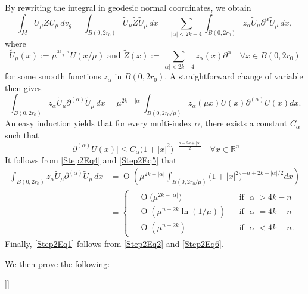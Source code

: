 \documentclass[reqno]{amsart}
\numberwithin{equation}{section}
\DeclareMathOperator{\bigO}{O}
\newcommand{\R}{\mathbb{R}}
\newcommand{\<}{\left<}
\renewcommand{\>}{\right>}
\renewcommand{\[}{\left[}
\renewcommand{\]}{\right]}
\renewcommand{\(}{\left(}
\renewcommand{\)}{\right)}
\begin{document}
\[\[\proof[Proof of Step~\ref{Step2}]
By rewriting the integral in geodesic normal coordinates, we obtain
\begin{equation}\label{Step2Eq2}
\int_MU_\mu ZU_\mu\,dv_g=\int_{B\(0,2r_0\)}\widetilde{U}_\mu\widetilde{Z}\widetilde{U}_\mu\,dx=\sum_{\left|\alpha\right|<2k-4}\int_{B\(0,2r_0\)} z_\alpha\widetilde{U}_\mu\partial^{\alpha}\widetilde{U}_\mu\,dx,
\end{equation}
where 
\begin{equation}\label{Step2Eq3}
\widetilde{U}_\mu\(x\):=\mu^{\frac{2k-n}{2}}U\(x/\mu\)\text{ and }\widetilde{Z}\(x\):=\sum_{\left|\alpha\right|<2k-4}z_\alpha\(x\)\partial^{\alpha}\quad\forall x\in B\(0,2r_0\)
\end{equation}
for some smooth functions $z_\alpha$ in $B\(0,2r_0\)$. A straightforward change of variable then gives
\begin{equation}\label{Step2Eq4}
\int_{B\(0,2r_0\)} z_\alpha\widetilde{U}_\mu\partial^{\(\alpha\)}\widetilde{U}_\mu\,dx=\mu^{2k-\left|\alpha\right|}\int_{B\(0,2r_0/\mu\)} z_\alpha\(\mu x\)U\(x\)\partial^{\(\alpha\)}U\(x\)dx.
\end{equation}
An easy induction yields that for every multi-index $\alpha$, there exists a constant $C_\alpha$ such that 
\begin{equation}\label{Step2Eq5}
\big|\partial^{\(\alpha\)}U\(x\)\big|\le C_\alpha\big(1+\left|x\right|^2\big)^{-\frac{n-2k+\left|\alpha\right|}{2}}\quad\forall x\in\R^n
\end{equation}
It follows from \eqref{Step2Eq4} and \eqref{Step2Eq5} that
\begin{align}\label{Step2Eq6}
\int_{B\(0,2r_0\)} z_\alpha\widetilde{U}_\mu\partial^{\(\alpha\)}\widetilde{U}_\mu\,dx&=\bigO\(\mu^{2k-\left|\alpha\right|}\int_{B\(0,2r_0/\mu\)}\big(1+\left|x\right|^2\big)^{-n+2k-\left|\alpha\right|/2}dx\)\nonumber\\
&=\left\{\begin{aligned}&\bigO\big(\mu^{2k-\left|\alpha\right|}\big)&&\text{if }\left|\alpha\right|>4k-n\\&\bigO\(\mu^{n-2k}\ln\(1/\mu\)\)&&\text{if }\left|\alpha\right|=4k-n\\&\bigO\(\mu^{n-2k}\)&&\text{if }\left|\alpha\right|<4k-n.\end{aligned}\right.
\end{align}
Finally, \eqref{Step2Eq1} follows from \eqref{Step2Eq2} and \eqref{Step2Eq6}. 
\endproof

We then prove the following:

\]\]
\end{document}
